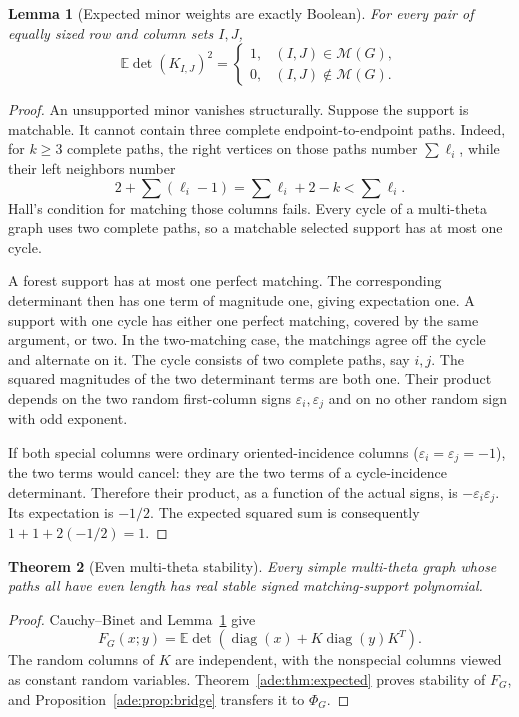 \documentclass[11pt]{article}
\numberwithin{equation}{section}
\newtheorem{theorem}{Theorem}[section]
\newtheorem{lemma}[theorem]{Lemma}
\theoremstyle{definition}
\newcommand{\PM}{\mathcal M}
\newcommand{\diag}{\operatorname{diag}}
\newcommand{\EE}{\mathbb E}
\newcommand{\ep}{\varepsilon}
\begin{document}
\begin{lemma}[Expected minor weights are exactly Boolean]
\label{ade:lem:evenminors}
For every pair of equally sized row and column sets $I,J$,
\begin{equation}
 \EE\det(K_{I,J})^2
 =\begin{cases}
   1,&(I,J)\in\PM(G),\\
   0,&(I,J)\notin\PM(G).
  \end{cases}
 \label{ade:eq:evenweights}
\end{equation}
\end{lemma}
\begin{proof}
An unsupported minor vanishes structurally.  Suppose the support is
matchable.  It cannot contain three complete endpoint-to-endpoint paths.
Indeed, for $k\ge3$ complete paths, the right vertices on those paths
number $\sum\ell_i$, while their left neighbors number
\[
 2+\sum(\ell_i-1)=\sum\ell_i+2-k<\sum\ell_i.
\]
Hall's condition for matching those columns fails.  Every cycle of a
multi-theta graph uses two complete paths, so a matchable selected support
has at most one cycle.

A forest support has at most one perfect matching.  The corresponding
determinant then has one term of magnitude one, giving expectation one.
A support with one cycle has either one perfect matching, covered by the
same argument, or two.  In the two-matching case, the matchings agree off
the cycle and alternate on it.  The cycle consists of two complete paths,
say $i,j$.  The squared magnitudes of the two determinant terms are both
one.  Their product depends on the two random first-column signs
$\ep_i,\ep_j$ and on no other random sign with odd exponent.

If both special columns were ordinary oriented-incidence columns
($\ep_i=\ep_j=-1$), the two terms would cancel: they are the two terms
of a cycle-incidence determinant.  Therefore their product, as a function
of the actual signs, is $-\ep_i\ep_j$.  Its expectation is $-1/2$.
The expected squared sum is consequently $1+1+2(-1/2)=1$.
\end{proof}

\begin{theorem}[Even multi-theta stability]
\label{ade:thm:eventheta}
Every simple multi-theta graph whose paths all have even length has real
stable signed matching-support polynomial.
\end{theorem}
\begin{proof}
Cauchy--Binet and Lemma~\ref{ade:lem:evenminors} give
\[
 F_G(x;y)=\EE\det(\diag(x)+K\diag(y)K^T).
\]
The random columns of $K$ are independent, with the nonspecial columns
viewed as constant random variables.  Theorem~\ref{ade:thm:expected} proves
stability of $F_G$, and Proposition~\ref{ade:prop:bridge} transfers it to
$\Phi_G$.
\end{proof}
\end{document}
